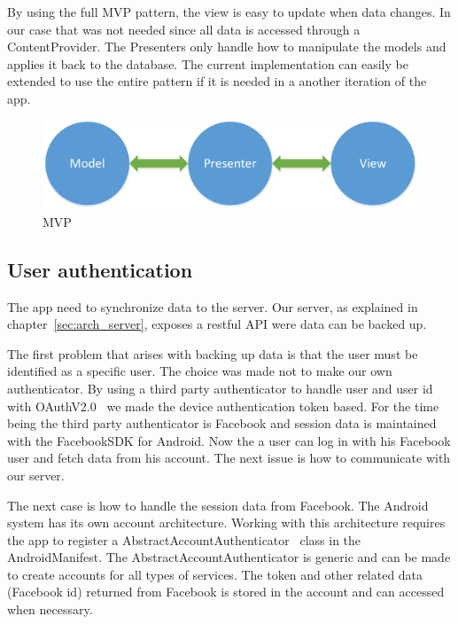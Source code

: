 By using the full MVP pattern, the view is easy to update when data changes. In our case that was not needed since all data is accessed through a ContentProvider. The Presenters only handle how to manipulate the models and applies it back to the database. The current implementation can easily be extended to use the entire pattern if it is needed in a another iteration of the app.  

\begin{figure}[H]
\includegraphics[width=\textwidth]{ch/architecture/fig/mvp.png}
\caption{MVP}
\label{fig:mvp}
\end{figure}

\subsection{User authentication}
The app need to synchronize data to the server. Our server, as explained in chapter~\ref{sec:arch_server}, exposes a restful API were data can be backed up.

The first problem that arises with backing up data is that the user must be identified as a specific user. The choice was made not to make our own authenticator. By using a third party authenticator to handle user and user id with OAuthV2.0~\cite{oauthv2.0} we made the device authentication token based.
For the time being the third party authenticator is Facebook and session data is maintained with the FacebookSDK for Android. 
Now the a user can log in with his Facebook user and fetch data from his account. The next issue is how to communicate with our server. 

The next case is how to handle the session data from Facebook. The Android system has its own account architecture. Working with this architecture requires the app to register a AbstractAccountAuthenticator~\cite{androidAccount} class in the AndroidManifest. The AbstractAccountAuthenticator is generic and can be made to create accounts for all types of services. The token and other related data (Facebook id) returned from Facebook is stored in the account and can accessed when necessary.

